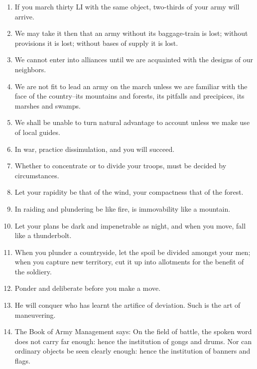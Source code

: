\begin{enumerate}
  \item If you march thirty LI with the same object, two-thirds of
    your army will arrive.

  \item We may take it then that an army without its baggage-train is
    lost; without provisions it is lost; without bases of supply it is
    lost.

  \item We cannot enter into alliances until we are acquainted with
    the designs of our neighbors.

  \item We are not fit to lead an army on the march unless we are
    familiar with the face of the country--its mountains and forests,
    its pitfalls and precipices, its marshes and swamps.

  \item We shall be unable to turn natural advantage to account unless
    we make use of local guides.

  \item In war, practice dissimulation, and you will succeed.

  \item Whether to concentrate or to divide your troops, must be
    decided by circumstances.

  \item Let your rapidity be that of the wind, your compactness that
    of the forest.

  \item In raiding and plundering be like fire, is immovability like a
    mountain.

  \item Let your plans be dark and impenetrable as night, and when you
    move, fall like a thunderbolt.

  \item When you plunder a countryside, let the spoil be divided
    amongst your men; when you capture new territory, cut it up into
    allotments for the benefit of the soldiery.

  \item Ponder and deliberate before you make a move.

  \item He will conquer who has learnt the artifice of deviation. Such
    is the art of maneuvering.

  \item The Book of Army Management says: On the field of battle, the
    spoken word does not carry far enough: hence the institution of
    gongs and drums. Nor can ordinary objects be seen clearly enough:
    hence the institution of banners and flags.


\end{enumerate}

